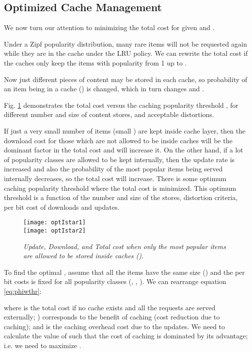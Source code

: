 \documentclass[conference]{IEEEtran}
\theoremstyle{plain}
\theoremstyle{remark}
\begin{document}
\subsection{Optimized Cache Management}
\label{subsec:optimumi}

We now turn our attention to minimizing the total cost for given  and .


 Under a Zipf popularity distribution, many rare items will not be requested again while they are in the cache under the LRU policy. We can rewrite the total cost if the caches only keep the items with popularity from 1 up to . 




Now just  different pieces of content may be stored in each cache, so probability of an item  being in a cache () is changed, which in turn changes  and .

Fig. \ref{fig:optIstar} demonstrates the total cost versus the caching popularity threshold , for different number and size of content stores, and acceptable distortions.

If just a very small number of items (small ) are kept inside cache layer, then the download cost for those which are not allowed to be inside caches will be the dominant factor in the total cost and will increase it. On the other hand, if a lot of popularity classes are allowed to be kept internally, then the update rate is increased and also the probability of the most popular items being served internally decreases, so the total cost will increase. There is some optimum caching popularity threshold where the total cost is minimized. This optimum threshold is a function of the number and size of the stores, distortion criteria, per bit cost of downloads and updates.

\begin{figure}[http]
    \center
      \texttt{[image: optIstar1]}\\
      \texttt{[image: optIstar2]}\\
      \caption{\textit{Update, Download, and Total cost when only the  most popular items are allowed to be stored inside caches ().}}
    \label{fig:optIstar}
\end{figure}

To find the optimal , assume that all the items have the same size () and the per bit costs is fixed for all popularity classes (, , ). We can rearrange equation \ref{eq:phiwthr}:

where  is the total cost if no  cache  exists and all the  requests are served externally; ) corresponds to the benefit of caching (cost reduction due to caching); and  is the caching overhead cost due to the updates.  We need to calculate the value of  such that the cost of caching is dominated by its advantage; i.e. we need to maximize .
\end{document}
